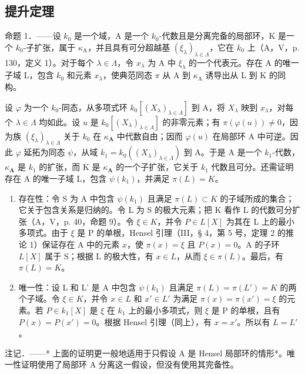 \subsection{提升定理}

命题 1．——设 \(k_{0}\) 是一个域，A 是一个 \(k_{0}\)-代数且是分离完备的局部环，K 是一个 \(k_{0}\)-子扩张，属于 \(\kappa_{\mathrm{A}}\)，并且具有可分超越基 \((\xi_{\lambda})_{\lambda \in \Lambda}\)，它在 \(k_{0}\) 上（A，V，p. 130，定义 1）。对于每个 \(\lambda \in \Lambda\)，令 \(x_{\lambda}\) 为 A 中 \(\xi_{\lambda}\) 的一个代表元。存在 A 的唯一子域 L，包含 \(k_{0}\) 和元素 \(x_{\lambda}\)，使典范同态 \(\pi\) 从 A 到 \(\kappa_{\mathrm{A}}\) 诱导出从 L 到 K 的同构。

设 \(\varphi\) 为一个 \(k_{0}\)-同态，从多项式环 \(k_{0}[(X_{\lambda})_{\lambda \in \Lambda}]\) 到 A，将 \(X_{\lambda}\) 映到 \(x_{\lambda}\)，对每个 \(\lambda \in \Lambda\) 均如此。设 \(u\) 是 \(k_{0}[(X_{\lambda})_{\lambda \in \Lambda}]\) 的非零元素；有 \(\pi (\varphi (u)) \neq 0\)，因为族 \((\xi_{\lambda})_{\lambda \in \Lambda}\) 关于 \(k_{0}\) 在 \(\kappa_{\mathbf{A}}\) 中代数自由；因而 \(\varphi (u)\) 在局部环 A 中可逆。因此 \(\varphi\) 延拓为同态 \(\psi\)，从域 \(k_{1} = k_{0}((X_{\lambda})_{\lambda \in \Lambda})\) 到 A。于是 A 是一个 \(k_{1}\)-代数，\(\kappa_{\mathbf{A}}\) 是 \(k_{1}\) 的扩张，而 K 是 \(\kappa_{\mathbf{A}}\) 的一个子扩张，它关于 \(k_{1}\) 代数且可分。还需证明存在 A 的唯一子域 L，包含 \(\psi(k_{1})\)，并满足 \(\pi(L) = K\)。

\begin{enumerate}
\def\labelenumi{\alph{enumi})}
\item
  存在性：令 S 为 A 中包含 \(\psi(k_1)\) 且满足 \(\pi(L) \subset K\) 的子域所成的集合；它关于包含关系是归纳的。令 L 为 S 的极大元素；把 K 看作 L 的代数可分扩张（A，V，p. 40，命题 9）。令 \(\xi \in K\)，并令 \(P \in L[X]\) 为其在 L 上的最小多项式。由于 \(\xi\) 是 P 的单根，Hensel 引理（III，§ 4，第 5 号，定理 2 的推论 1）保证存在 A 中的元素 \(x\)，使 \(\pi(x) = \xi\) 且 \(P(x) = 0\)。A 的子环 \(L[X]\) 属于 S；根据 L 的极大性，有 \(x \in L\)，从而 \(\xi \in \pi(L)\)。最后，有 \(\pi(L) = K\)。
\item
  唯一性：设 L 和 L' 是 A 中包含 \(\psi(k_1)\) 且满足 \(\pi(L) = \pi(L') = K\) 的两个子域。令 \(\xi \in K\)，并令 \(x \in L\) 和 \(x' \in L'\) 为满足 \(\pi(x) = \pi(x') = \xi\) 的元素。若 \(P \in k_1[X]\) 是 \(\xi\) 在 \(k_1\) 上的最小多项式，则 \(\xi\) 是 P 的单根，且有 \(P(x) = P(x') = 0\)。根据 Hensel 引理（同上），有 \(x = x'\)。所以有 \(L = L'\)。
\end{enumerate}

注记．——* 上面的证明更一般地适用于只假设 A 是 Hensel 局部环的情形*。唯一性证明使用了局部环 A 分离这一假设，但没有使用其完备性。

